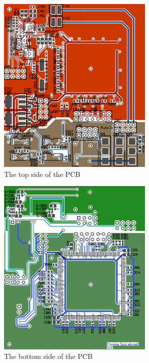 \begin{figure}[H]
	\centering
	\includegraphics[width=280px]{./img/overview_top.png}
	\caption{The top side of the PCB}
	\label{fig:pcbtop}
\end{figure}
\begin{figure}[H]
	\centering
	\includegraphics[width=280px]{./img/overview_bottom.png}
	\caption{The bottom side of the PCB}
	\label{fig:pcbbottom}
\end{figure}
